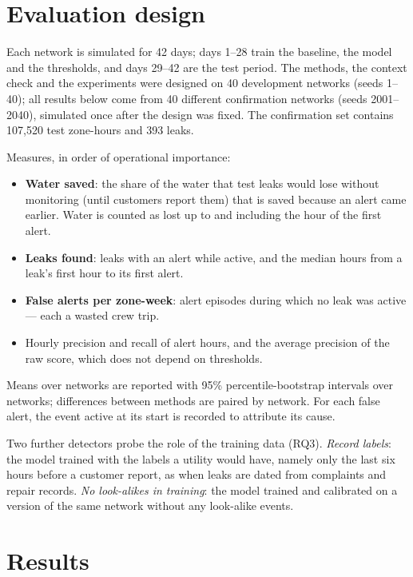 \documentclass[11pt,a4paper]{article}
\begin{document}
\section{Evaluation design}
\label{sec:eval}

Each network is simulated for 42 days; days 1--28 train the baseline, the model and the thresholds, and days 29--42 are the test period. The methods, the context check and the experiments were designed on 40 development networks (seeds 1--40); all results below come from 40 different confirmation networks (seeds 2001--2040), simulated once after the design was fixed. The confirmation set contains 107{,}520 test zone-hours and 393 leaks.

Measures, in order of operational importance:
\begin{itemize}[leftmargin=1.2em]
  \item \textbf{Water saved}: the share of the water that test leaks would lose without monitoring (until customers report them) that is saved because an alert came earlier. Water is counted as lost up to and including the hour of the first alert.
  \item \textbf{Leaks found}: leaks with an alert while active, and the median hours from a leak's first hour to its first alert.
  \item \textbf{False alerts per zone-week}: alert episodes during which no leak was active --- each a wasted crew trip.
  \item Hourly precision and recall of alert hours, and the average precision of the raw score, which does not depend on thresholds.
\end{itemize}
Means over networks are reported with 95\% percentile-bootstrap intervals over networks; differences between methods are paired by network. For each false alert, the event active at its start is recorded to attribute its cause.

Two further detectors probe the role of the training data (RQ3). \emph{Record labels}: the model trained with the labels a utility would have, namely only the last six hours before a customer report, as when leaks are dated from complaints and repair records. \emph{No look-alikes in training}: the model trained and calibrated on a version of the same network without any look-alike events.

\section{Results}
\label{sec:results}
\end{document}
